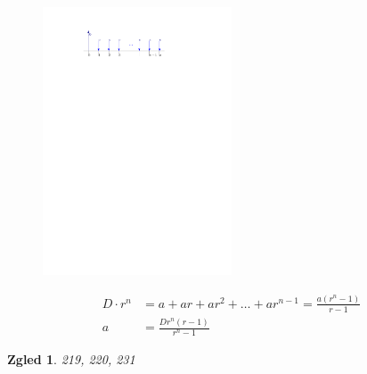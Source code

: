 \documentclass{article}
\newtheorem*{zgled}{Zgled}
\begin{document}
\begin{figure}[H]
\includegraphics[width=0.5\textwidth]{izplacila.pdf}
\centering
\end{figure}
\begin{align*}
    D\cdot r^n &= a+ar+ar^2+\ldots+ar^{n-1}=\frac{a(r^n -1)}{r-1}\\
    a&=\frac{Dr^n (r-1)}{r^n -1}
\end{align*} 

\begin{zgled}
    219, 220, 231
\end{zgled}
\end{document}
